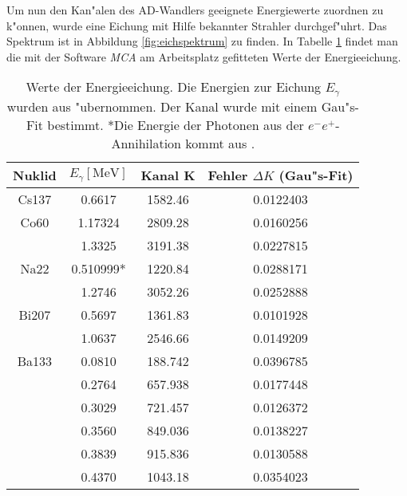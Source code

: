 \documentclass[12pt]{article}
\begin{document}
Um nun den Kan"alen des AD-Wandlers geeignete Energiewerte zuordnen zu k"onnen, wurde eine Eichung mit Hilfe bekannter Strahler durchgef"uhrt. Das Spektrum ist in Abbildung \ref{fig:eichspektrum} zu finden. In Tabelle \ref{tab:eichung_roh} findet man die mit der Software \textit{MCA} am Arbeitsplatz gefitteten Werte der Energieeichung.  
\begin{table}[b!]
	\centering
	\small
	\begin{tabular}{cccc}
		\hline 
		\rowcolor[gray]{0.8} Nuklid & $E_{\gamma} [\si{\mega\electronvolt}]$ & Kanal K & Fehler $\Delta K$ (Gau"s-Fit) \\ 
		\hline 
		Cs137 & 0.6617 & 1582.46 & 0.0122403 \\ 
		\hline 
	\rowcolor[gray]{0.95}	Co60 & 1.17324 & 2809.28 & 0.0160256 \\ 
		\hline 
		& 1.3325 & 3191.38 & 0.0227815 \\ 
		\hline 
	\rowcolor[gray]{0.95} Na22	& 0.510999* & 1220.84 & 0.0288171 \\ 
		\hline 
		& 1.2746 & 3052.26 & 0.0252888 \\ 
		\hline 
	\rowcolor[gray]{0.95} Bi207	& 0.5697 & 1361.83 & 0.0101928 \\ 
		\hline 
		& 1.0637 & 2546.66 & 0.0149209 \\ 
		\hline 
	\rowcolor[gray]{0.95} Ba133	& 0.0810 & 188.742 & 0.0396785 \\ 
		\hline 
		& 0.2764 & 657.938 & 0.0177448 \\ 
		\hline
	\rowcolor[gray]{0.95}	& 0.3029 & 721.457 & 0.0126372 \\ 
		\hline 
		& 0.3560 & 849.036 & 0.0138227 \\ 
		\hline
	\rowcolor[gray]{0.95}	& 0.3839 & 915.836 & 0.0130588 \\ 
		\hline 
		& 0.4370 & 1043.18 & 0.0354023 \\ 
		\hline
	\end{tabular} 
	\caption{Werte der Energieeichung. Die Energien zur Eichung $E_{\gamma}$ wurden aus \cite{cite1} "ubernommen. Der Kanal wurde mit einem Gau"s-Fit bestimmt. *Die Energie der Photonen aus der $e^{-}e^{+}$-Annihilation kommt aus \cite{cite2}.}
	\label{tab:eichung_roh}
\end{table}
\end{document}
